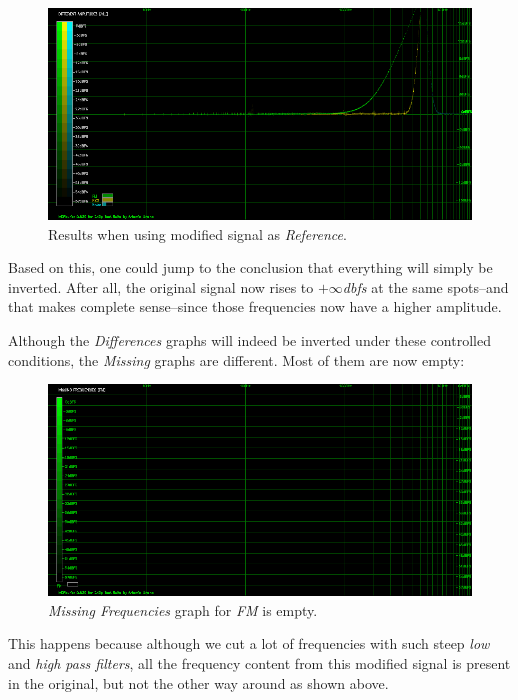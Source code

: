 \documentclass[10pt,a4paper]{report}
\newcommand{\db}[1]{\textit{\mbox{#1\acrshort{dbfs}}}}
\begin{document}
\begin{figure}[H]
	\centering
	\includegraphics[width=1.0\linewidth]{images/interpretation/Plot4-7-Reversed.png}
	\caption[Reversed]{Results when using modified signal as \textit{Reference}.}
	\label{fig:plot4-7-reversed}
\end{figure}

Based on this, one could jump to the conclusion that everything will simply be inverted. After all, the original signal now rises to \db{$+\infty$} at the same spots--and that makes complete sense--since those frequencies now have a higher amplitude. 

Although the \textit{Differences} graphs will indeed be inverted under these controlled conditions, the \textit{Missing} graphs are different. Most of them are now empty:

\begin{figure}[H]
	\centering
	\includegraphics[width=1.0\linewidth]{images/interpretation/Plot4-8-Missing-FM-Inverted.png}
	\caption[Reversed FM Missing]{\textit{Missing Frequencies} graph for \textit{FM} is empty.}
	\label{fig:plot4-8-missing-fm-inverted}
\end{figure}

This happens because although we cut a lot of frequencies with such steep \textit{low} and \textit{high pass filters}, all the frequency content from this modified signal is present in the original, but not the other way around as shown above.
\end{document}

